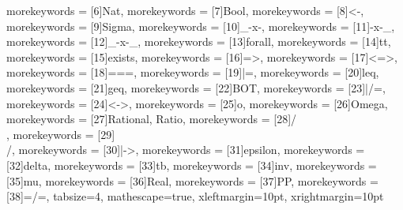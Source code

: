 {    morekeywords = [6]{Nat},
    morekeywords = [7]{Bool},
    morekeywords = [8]{<-},
    morekeywords = [9]{Sigma},
    morekeywords = [10]{_-x-},
    morekeywords = [11]{-x-_},
    morekeywords = [12]{_-x-_},
    morekeywords = [13]{forall},
    morekeywords = [14]{tt},
    morekeywords = [15]{exists},
    morekeywords = [16]{=>},
    morekeywords = [17]{<=>},
    morekeywords = [18]{===},
    morekeywords = [19]{|=},
    morekeywords = [20]{leq},    
    morekeywords = [21]{geq}, 
    morekeywords = [22]{BOT},
    morekeywords = [23]{|/=},
    morekeywords = [24]{<->},
    morekeywords = [25]{o},
    morekeywords = [26]{Omega},
    morekeywords = [27]{Rational, Ratio},
    morekeywords = [28]{/\\},
    morekeywords = [29]{\\/},
    morekeywords = [30]{|->},
    morekeywords = [31]{epsilon},
    morekeywords = [32]{delta},
    morekeywords = [33]{tb},
    morekeywords = [34]{inv},
    morekeywords = [35]{mu},
    morekeywords = [36]{Real},
    morekeywords = [37]{PP},
    morekeywords = [38]{=/=},
    tabsize=4,
    mathescape=true,
    xleftmargin=10pt,
    xrightmargin=10pt
}



\newcommand{\arr}{\rightarrow}
\newcommand{\arrleft}{\leftarrow}
\newcommand{\impl}{\Rightarrow}
\renewcommand{\iff}{\Leftrightarrow}
\newcommand{\fmap}{<\!\!\$\!\!>}

	

